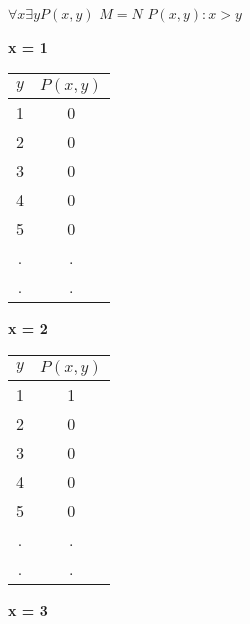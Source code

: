 \documentclass[russian]{lecture-notes}
\begin{document}
    \begin{example}

        $\forall x \exists y P(x,y) $ \qquad $M = N$ \qquad $P(x,y) : x > y$

        \textbf{x = 1}

        \begin{table}[h!]
                \centering
                \begin{tabular}{|c|c|}
                    \hline
                    $ y $ & $P(x,y)$ \\ \hline
                    1      & 0       \\ \hline
                    2      & 0       \\ \hline
                    3      & 0       \\ \hline
                    4      & 0       \\ \hline
                    5      & 0       \\ \hline
                    .      & .       \\ \hline
                    .      & .       \\ \hline
                \end{tabular}
            \end{table}

        \textbf{x = 2}

        \begin{table}[h!]
                \centering
                \begin{tabular}{|c|c|}
                    \hline
                    $ y $ & $P(x,y)$ \\ \hline
                    1      & 1       \\ \hline
                    2      & 0       \\ \hline
                    3      & 0       \\ \hline
                    4      & 0       \\ \hline
                    5      & 0       \\ \hline
                    .      & .       \\ \hline
                    .      & .       \\ \hline
                \end{tabular}
            \end{table}

        \textbf{x = 3}


\end{example}
\end{document}

